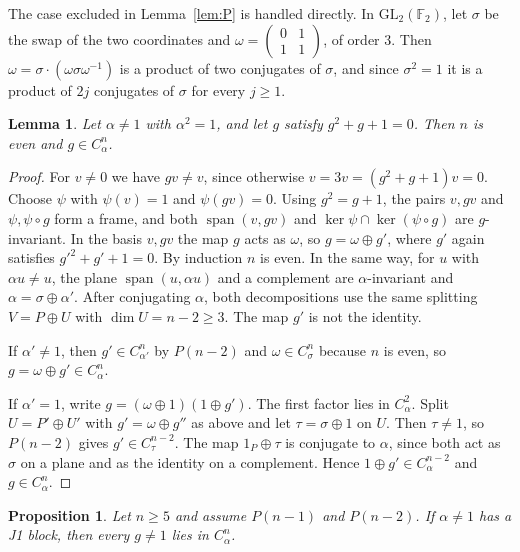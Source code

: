 \documentclass[11pt]{amsart}
\newtheorem{lemma}[theorem]{Lemma}
\newtheorem{proposition}[theorem]{Proposition}
\theoremstyle{definition}
\theoremstyle{remark}
\newcommand{\F}{\mathbb{F}_2}
\newcommand{\GL}{\mathrm{GL}}
\newcommand{\Span}{\operatorname{span}}
\begin{document}
The case excluded in Lemma~\ref{lem:P} is handled directly. In $\GL_2(\F)$, let $\sigma$ be the
swap of the two coordinates and $\omega=\left(\begin{smallmatrix}0&1\\1&1\end{smallmatrix}\right)$,
of order $3$. Then $\omega=\sigma\cdot(\omega\sigma\omega^{-1})$ is a product of two conjugates of
$\sigma$, and since $\sigma^2=1$ it is a product of $2j$ conjugates of $\sigma$ for every $j\ge1$.

\begin{lemma}\label{lem:exception}
Let $\alpha\ne1$ with $\alpha^2=1$, and let $g$ satisfy $g^2+g+1=0$. Then $n$ is even and
$g\in C_\alpha^n$.
\end{lemma}

\begin{proof}
For $v\ne0$ we have $gv\ne v$, since otherwise $v=3v=(g^2+g+1)v=0$. Choose $\psi$ with
$\psi(v)=1$ and $\psi(gv)=0$. Using $g^2=g+1$, the pairs $v,gv$ and $\psi,\psi\circ g$ form a
frame, and both $\Span(v,gv)$ and $\ker\psi\cap\ker(\psi\circ g)$ are $g$-invariant. In the basis
$v,gv$ the map $g$ acts as $\omega$, so $g=\omega\oplus g'$, where $g'$ again satisfies
$g'^2+g'+1=0$. By induction $n$ is even. In the same way, for $u$ with $\alpha u\ne u$, the plane
$\Span(u,\alpha u)$ and a complement are $\alpha$-invariant and $\alpha=\sigma\oplus\alpha'$.
After conjugating $\alpha$, both decompositions use the same splitting $V=P\oplus U$ with
$\dim U=n-2\ge3$. The map $g'$ is not the identity.

If $\alpha'\ne1$, then $g'\in C_{\alpha'}^n$ by $P(n-2)$ and $\omega\in C_\sigma^n$ because $n$ is
even, so $g=\omega\oplus g'\in C_\alpha^n$.

If $\alpha'=1$, write $g=(\omega\oplus1)(1\oplus g')$. The first factor lies in $C_\alpha^2$.
Split $U=P'\oplus U'$ with $g'=\omega\oplus g''$ as above and let $\tau=\sigma\oplus1$ on $U$.
Then $\tau\ne1$, so $P(n-2)$ gives $g'\in C_\tau^{n-2}$. The map $1_P\oplus\tau$ is conjugate to
$\alpha$, since both act as $\sigma$ on a plane and as the identity on a complement. Hence
$1\oplus g'\in C_\alpha^{n-2}$ and $g\in C_\alpha^n$.
\end{proof}

\begin{proposition}\label{prop:J1}
Let $n\ge5$ and assume $P(n-1)$ and $P(n-2)$. If $\alpha\ne1$ has a J1 block, then every
$g\ne1$ lies in $C_\alpha^n$.
\end{proposition}
\end{document}
